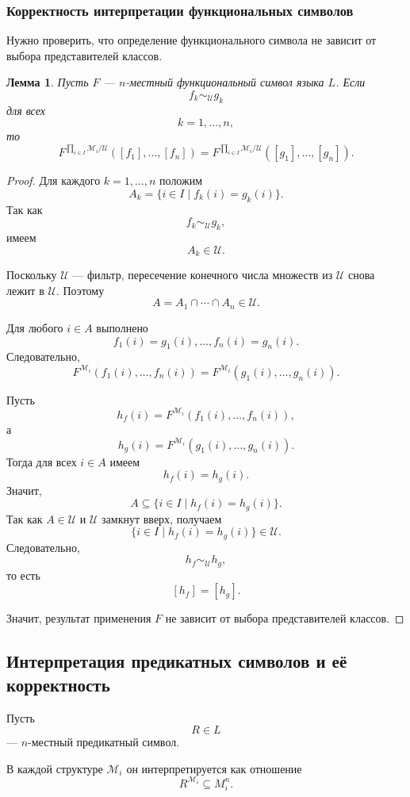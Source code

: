 \documentclass[12pt,a4paper,oneside,openany]{book}
\theoremstyle{definition}
\theoremstyle{plain}
\newtheorem{lemma}{Лемма}[chapter]
\theoremstyle{remark}
\begin{document}
\subsubsection{Корректность интерпретации функциональных символов}

Нужно проверить, что определение функционального символа не зависит от выбора представителей классов.

\begin{lemma}
Пусть $F$ — $n$-местный функциональный символ языка $L$. Если
\[
f_k\sim_{\mathcal U} g_k
\]
для всех
\[
k=1,\ldots,n,
\]
то
\[
F^{\prod_{i\in I}\mathcal M_i/\mathcal U}
([f_1],\ldots,[f_n])
=
F^{\prod_{i\in I}\mathcal M_i/\mathcal U}
([g_1],\ldots,[g_n]).
\]
\end{lemma}

\begin{proof}
Для каждого $k=1,\ldots,n$ положим
\[
A_k
=
\{i\in I\mid f_k(i)=g_k(i)\}.
\]
Так как
\[
f_k\sim_{\mathcal U} g_k,
\]
имеем
\[
A_k\in\mathcal U.
\]

Поскольку $\mathcal U$ — фильтр, пересечение конечного числа множеств из $\mathcal U$ снова лежит в $\mathcal U$. Поэтому
\[
A=A_1\cap\cdots\cap A_n\in\mathcal U.
\]

Для любого $i\in A$ выполнено
\[
f_1(i)=g_1(i),\ldots,f_n(i)=g_n(i).
\]
Следовательно,
\[
F^{\mathcal M_i}(f_1(i),\ldots,f_n(i))
=
F^{\mathcal M_i}(g_1(i),\ldots,g_n(i)).
\]

Пусть
\[
h_f(i)=F^{\mathcal M_i}(f_1(i),\ldots,f_n(i)),
\]
а
\[
h_g(i)=F^{\mathcal M_i}(g_1(i),\ldots,g_n(i)).
\]
Тогда для всех $i\in A$ имеем
\[
h_f(i)=h_g(i).
\]
Значит,
\[
A\subseteq\{i\in I\mid h_f(i)=h_g(i)\}.
\]
Так как $A\in\mathcal U$ и $\mathcal U$ замкнут вверх, получаем
\[
\{i\in I\mid h_f(i)=h_g(i)\}\in\mathcal U.
\]
Следовательно,
\[
h_f\sim_{\mathcal U}h_g,
\]
то есть
\[
[h_f]=[h_g].
\]

Значит, результат применения $F$ не зависит от выбора представителей классов.
\end{proof}

\subsection{Интерпретация предикатных символов и её корректность}

Пусть
\[
R\in L
\]
— $n$-местный предикатный символ.

В каждой структуре $\mathcal M_i$ он интерпретируется как отношение
\[
R^{\mathcal M_i}\subseteq M_i^n.
\]
\end{document}
